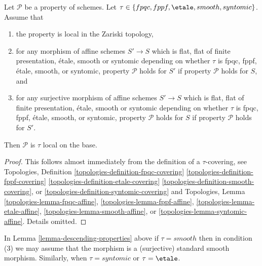 \begin{lemma}
\label{lemma-descending-properties}
Let $\mathcal{P}$ be a property of schemes.
Let $\tau \in \{fpqc, \linebreak[0] fppf, \linebreak[0]
\etale, \linebreak[0] smooth, \linebreak[0] syntomic\}$.
Assume that
\begin{enumerate}
\item the property is local in the Zariski topology,
\item for any morphism of affine schemes $S' \to S$
which is flat, flat of finite presentation,
\'etale, smooth or syntomic depending on whether $\tau$ is
fpqc, fppf, \'etale, smooth, or syntomic,
property $\mathcal{P}$ holds for $S'$ if property $\mathcal{P}$
holds for $S$, and
\item for any surjective morphism of affine schemes $S' \to S$
which is flat, flat of finite presentation,
\'etale, smooth or syntomic depending on whether $\tau$ is
fpqc, fppf, \'etale, smooth, or syntomic,
property $\mathcal{P}$ holds for $S$ if property $\mathcal{P}$
holds for $S'$.
\end{enumerate}
Then $\mathcal{P}$ is $\tau$ local on the base.
\end{lemma}

\begin{proof}
This follows almost immediately from the definition of
a $\tau$-covering, see
Topologies, Definition
\ref{topologies-definition-fpqc-covering}
\ref{topologies-definition-fppf-covering}
\ref{topologies-definition-etale-covering}
\ref{topologies-definition-smooth-covering}, or
\ref{topologies-definition-syntomic-covering}
and Topologies, Lemma
\ref{topologies-lemma-fpqc-affine},
\ref{topologies-lemma-fppf-affine},
\ref{topologies-lemma-etale-affine},
\ref{topologies-lemma-smooth-affine}, or
\ref{topologies-lemma-syntomic-affine}.
Details omitted.
\end{proof}

\begin{remark}
\label{remark-descending-properties-standard}
In Lemma \ref{lemma-descending-properties} above if
$\tau = smooth$ then in condition (3) we may assume that
the morphism is a (surjective) standard smooth morphism.
Similarly, when $\tau = syntomic$ or $\tau = \etale$.
\end{remark}





